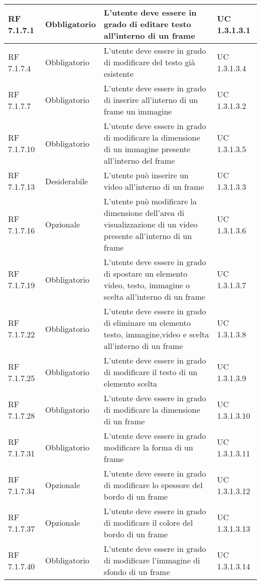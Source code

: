 {\begin{longtable} [c]{| p{2.5cm} | p{2.5cm} | p{6cm} |p{2.5cm}|}
			RF 7.1.7.1 & Obbligatorio & L'utente deve essere in grado di editare testo all'interno di un frame\ped{g} & UC 1.3.1.3.1\\
			\hline
			RF 7.1.7.4 & Obbligatorio & L'utente deve essere in grado di modificare del testo già esistente & UC 1.3.1.3.4\\
			\hline
			RF 7.1.7.7 & Obbligatorio & L'utente deve essere in grado di inserire all'interno di un frame\ped{g} un immagine & UC 1.3.1.3.2\\
			\hline
			RF 7.1.7.10 & Obbligatorio & L'utente deve essere in grado di modificare la dimensione di un immagine presente all'interno del frame\ped{g} & UC 1.3.1.3.5\\
			\hline
			RF 7.1.7.13 & Desiderabile & L'utente può inserire un video all'interno di un frame\ped{g} & UC 1.3.1.3.3\\
			\hline
			RF 7.1.7.16 & Opzionale & L'utente può modificare la dimensione dell’area di visualizzazione di un video presente all'interno di un frame\ped{g}  & UC 1.3.1.3.6\\
			\hline
			RF 7.1.7.19 & Obbligatorio & L'utente deve essere in grado di spostare un elemento video, testo, immagine o scelta all'interno di un frame\ped{g} & UC 1.3.1.3.7\\
			\hline
			RF 7.1.7.22 & Obbligatorio & L'utente deve essere in grado di eliminare un elemento testo, immagine,video e scelta all'interno di un frame\ped{g} & UC 1.3.1.3.8\\
			\hline
			RF 7.1.7.25 & Obbligatorio & L'utente deve essere in grado di modificare il testo di un elemento scelta\ped{g} & UC 1.3.1.3.9\\
			\hline
			RF 7.1.7.28 & Obbligatorio & L'utente deve essere in grado di modificare la dimensione di un frame\ped{g} & UC 1.3.1.3.10\\
			\hline
			RF 7.1.7.31 & Obbligatorio & L'utente deve essere in grado modificare la forma di un frame\ped{g} & UC 1.3.1.3.11\\
			\hline
			RF 7.1.7.34 & Opzionale & L'utente deve essere in grado di modificare lo spessore del bordo di un frame\ped{g} & UC 1.3.1.3.12\\
			\hline
			RF 7.1.7.37 & Opzionale & L'utente deve essere in grado di modificare il colore del bordo di un frame\ped{g} & UC 1.3.1.3.13\\
			\hline
			RF 7.1.7.40 & Obbligatorio & L'utente deve essere in grado di modificare l'immagine di sfondo di un frame\ped{g} & UC 1.3.1.3.14\\

\end{longtable}}
